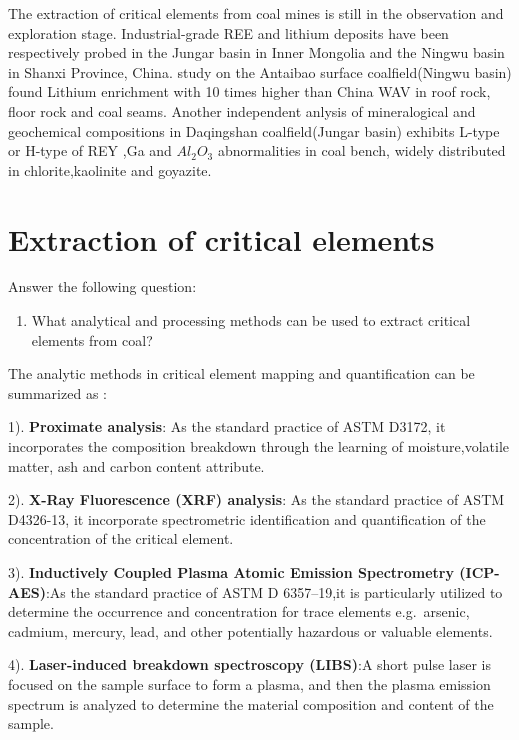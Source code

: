 \documentclass[preprint, 3p,
authoryear]{elsarticle} %
\providecommand{\tightlist}{%
  \setlength{\itemsep}{0pt}\setlength{\parskip}{0pt}}
\begin{document}
The extraction of critical elements from coal mines is still in the
observation and exploration stage. Industrial-grade REE and lithium
deposits have been respectively probed in the Jungar basin in Inner
Mongolia and the Ningwu basin in Shanxi Province, China. \citet{sun2010}
study on the Antaibao surface coalfield(Ningwu basin) found Lithium
enrichment with 10 times higher than China WAV in roof rock, floor rock
and coal seams. Another independent anlysis \citet{Dai2012} of
mineralogical and geochemical compositions in Daqingshan
coalfield(Jungar basin) exhibits L-type or H-type of REY ,Ga and
\(Al_{2}O_3\) abnormalities in coal bench, widely distributed in
chlorite,kaolinite and goyazite.

\hypertarget{extraction-of-critical-elements}{%
\section{Extraction of critical
elements}\label{extraction-of-critical-elements}}

Answer the following question:

\begin{enumerate}
\def\labelenumi{\arabic{enumi}.}
\setcounter{enumi}{4}
\tightlist
\item
  What analytical and processing methods can be used to extract critical
  elements from coal?
\end{enumerate}

The analytic methods in critical element mapping and quantification can
be summarized as \citet{Eterigho2021}:

1). \textbf{Proximate analysis}: As the standard practice of ASTM D3172,
it incorporates the composition breakdown through the learning of
moisture,volatile matter, ash and carbon content attribute.

2). \textbf{X-Ray Fluorescence (XRF) analysis}: As the standard practice
of ASTM D4326-13, it incorporate spectrometric identification and
quantification of the concentration of the critical element.

3). \textbf{Inductively Coupled Plasma Atomic Emission Spectrometry
(ICP-AES)}:As the standard practice of ASTM D 6357--19,it is
particularly utilized to determine the occurrence and concentration for
trace elements e.g.~arsenic, cadmium, mercury, lead, and other
potentially hazardous or valuable elements.

4). \textbf{Laser-induced breakdown spectroscopy (LIBS)}:A short pulse
laser is focused on the sample surface to form a plasma, and then the
plasma emission spectrum is analyzed to determine the material
composition and content of the sample.
\end{document}
